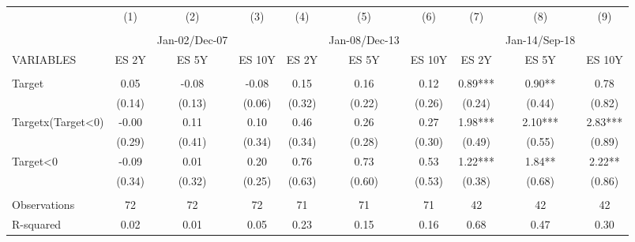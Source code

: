 \begin{tabular}{lccccccccc} \hline
 & (1) & (2) & (3) & (4) & (5) & (6) & (7) & (8) & (9) \\
 &  &  &  &  &  &  &  &  &  \\
 &  & Jan-02/Dec-07 &  &  & Jan-08/Dec-13 &  &  & Jan-14/Sep-18 &  \\
VARIABLES & ES 2Y & ES 5Y & ES 10Y & ES 2Y & ES 5Y & ES 10Y & ES 2Y & ES 5Y & ES 10Y \\ \hline
 &  &  &  &  &  &  &  &  &  \\
Target & 0.05 & -0.08 & -0.08 & 0.15 & 0.16 & 0.12 & 0.89*** & 0.90** & 0.78 \\
 & (0.14) & (0.13) & (0.06) & (0.32) & (0.22) & (0.26) & (0.24) & (0.44) & (0.82) \\
Targetx(Target<0) & -0.00 & 0.11 & 0.10 & 0.46 & 0.26 & 0.27 & 1.98*** & 2.10*** & 2.83*** \\
 & (0.29) & (0.41) & (0.34) & (0.34) & (0.28) & (0.30) & (0.49) & (0.55) & (0.89) \\
Target<0 & -0.09 & 0.01 & 0.20 & 0.76 & 0.73 & 0.53 & 1.22*** & 1.84** & 2.22** \\
 & (0.34) & (0.32) & (0.25) & (0.63) & (0.60) & (0.53) & (0.38) & (0.68) & (0.86) \\
 &  &  &  &  &  &  &  &  &  \\
Observations & 72 & 72 & 72 & 71 & 71 & 71 & 42 & 42 & 42 \\
 R-squared & 0.02 & 0.01 & 0.05 & 0.23 & 0.15 & 0.16 & 0.68 & 0.47 & 0.30 \\ \hline
\end{tabular}
